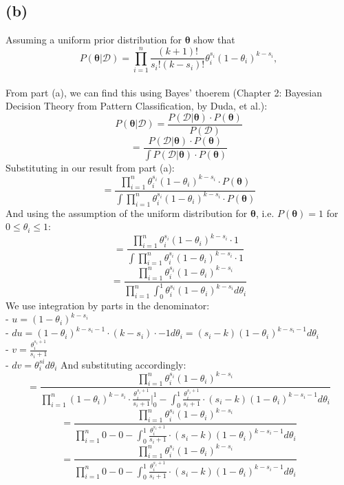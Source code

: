 \documentclass{article}
\begin{document}
{\subsection*{(b)}
Assuming a uniform prior distribution for \(\boldsymbol{\theta}\) show that 
\[
  P(\boldsymbol{\theta} | \mathcal{D}) = \prod_{i=1}^{n} \frac{(k+1)!}{s_i! (k - s_i)!} \theta_i^{s_i} (1 - \theta_i)^{k - s_i},
\] \\
From part (a), we can find this using Bayes' thoerem (Chapter 2: Bayesian Decision Theory from Pattern Classification, by Duda, et al.):
\[
  P(\boldsymbol{\theta} | \mathcal{D}) = \frac{P(\mathcal{D} | \boldsymbol{\theta}) \cdot P(\boldsymbol{\theta})}{P(\mathcal{D})}
\]
\[
  = \frac{P(\mathcal{D} | \boldsymbol{\theta}) \cdot P(\boldsymbol{\theta})}{\int P(\mathcal{D} | \boldsymbol{\theta}) \cdot P(\boldsymbol{\theta})}
\]
Substituting in our result from part (a):
\[
  = \frac{\prod_{i=1}^{n} \theta_i^{s_i} (1 - \theta_i)^{k - s_i} \cdot P(\boldsymbol{\theta})}{\int \prod_{i=1}^{n} \theta_i^{s_i} (1 - \theta_i)^{k - s_i} \cdot P(\boldsymbol{\theta})}
\]
And using the assumption of the uniform distribution for \(\boldsymbol{\theta}\), i.e. \(P(\boldsymbol{\theta}) = 1\) for \(0 \leq \theta_i \leq 1\):
\[
  = \frac{\prod_{i=1}^{n} \theta_i^{s_i} (1 - \theta_i)^{k - s_i} \cdot 1}{\int \prod_{i=1}^{n} \theta_i^{s_i} (1 - \theta_i)^{k - s_i} \cdot 1}
\] 
\[
  = \frac{\prod_{i=1}^{n} \theta_i^{s_i} (1 - \theta_i)^{k - s_i}}{\prod_{i=1}^{n} \int_{0}^{1} \theta_i^{s_i} (1 - \theta_i)^{k - s_i} d\theta_i}
\] 
We use integration by parts in the denominator: \\
- \(u = (1 - \theta_i)^{k - s_i}\) \\
- \(du = (1 - \theta_i)^{k - s_i - 1} \cdot (k - s_i) \cdot -1 d\theta_i = (s_i - k)(1 - \theta_i)^{k - s_i - 1} d\theta_i\)\\
- \(v = \frac{\theta_i^{s_i + 1}}{s_i + 1}\) \\
- \(dv = \theta_i^{si} d\theta_i\)
And substituting accordingly:
\[
  = \frac{\prod_{i=1}^{n} \theta_i^{s_i} (1 - \theta_i)^{k - s_i}}{\prod_{i=1}^{n} (1 - \theta_i)^{k - s_i} \cdot \frac{\theta_i^{s_i + 1}}{s_i + 1} |_{0}^{1} - \int_{0}^{1} \frac{\theta_i^{s_i + 1}}{s_i + 1} \cdot (s_i - k)(1 - \theta_i)^{k - s_i - 1} d \theta_i}
\] 
\[
  = \frac{\prod_{i=1}^{n} \theta_i^{s_i} (1 - \theta_i)^{k - s_i}}{\prod_{i=1}^{n} 0 - 0 - \int_{0}^{1} \frac{\theta_i^{s_i + 1}}{s_i + 1} \cdot (s_i - k)(1 - \theta_i)^{k - s_i - 1} d \theta_i}
\] 
\[
  = \frac{\prod_{i=1}^{n} \theta_i^{s_i} (1 - \theta_i)^{k - s_i}}{\prod_{i=1}^{n} 0 - 0 - \int_{0}^{1} \frac{\theta_i^{s_i + 1}}{s_i + 1} \cdot (s_i - k)(1 - \theta_i)^{k - s_i - 1} d \theta_i}
\]}
\end{document}
